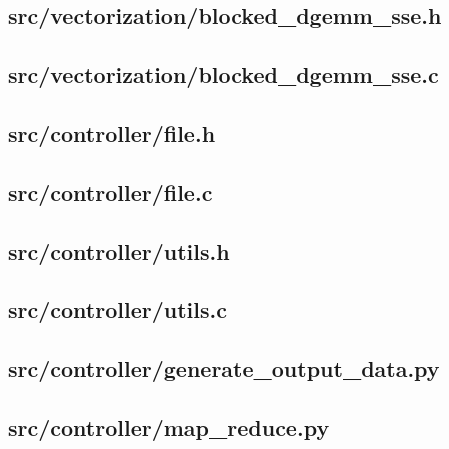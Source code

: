 \subsection{src/vectorization/blocked\_dgemm\_sse.h}
	
	\newpage

\subsection{src/vectorization/blocked\_dgemm\_sse.c}
	
	\newpage

\subsection{src/controller/file.h}
	
	\newpage

\subsection{src/controller/file.c}
	
	\newpage

\subsection{src/controller/utils.h}
	
	\newpage

\subsection{src/controller/utils.c}
	
	\newpage

\subsection{src/controller/generate\_output\_data.py}
	
	\newpage

\subsection{src/controller/map\_reduce.py}
	
	\newpage

